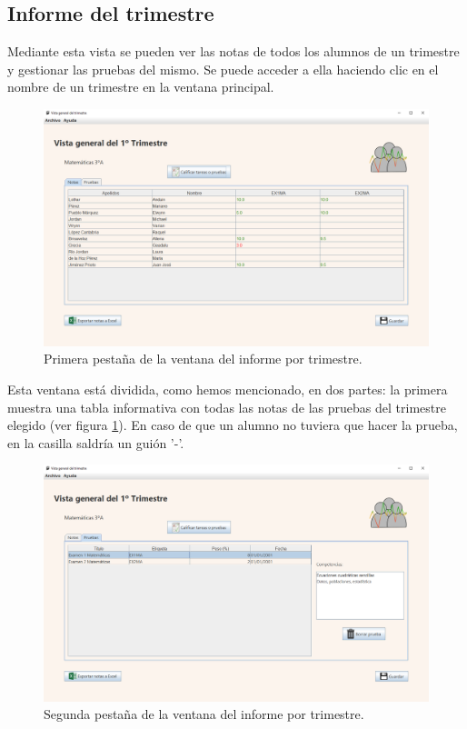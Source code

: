 \subsection{Informe del trimestre}
Mediante esta vista se pueden ver las notas de todos los alumnos de un trimestre y gestionar las pruebas del mismo. Se puede acceder a ella haciendo clic en el nombre de un trimestre en la ventana principal.

\begin{figure}[H]
\centering\includegraphics[width=1\linewidth]{figs/informetrimestre.png}
\caption{Primera pestaña de la ventana del informe por trimestre.}
\label{Fig:informetrimestre}
\end{figure}

Esta ventana está dividida, como hemos mencionado, en dos partes: la primera muestra una tabla informativa con todas las notas de las pruebas del trimestre elegido (ver figura \ref{Fig:informetrimestre}). En caso de que un alumno no tuviera que hacer la prueba, en la casilla saldría un guión '-'. 

\begin{figure}[H]
\centering\includegraphics[width=1\linewidth]{figs/informetrimestre2.png}
\caption{Segunda pestaña de la ventana del informe por trimestre.}
\label{Fig:informetrimestre2}
\end{figure}

